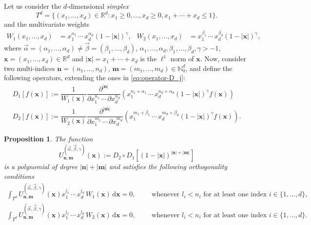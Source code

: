 \documentclass[11pt,reqno]{amsart}
\newcommand{\NN}{\mathbb{N}}
\newcommand{\RR}{\mathbb{R}}
\newcommand{\dr}{\mathrm{d}}
\newtheorem{proposition}[theorem]{Proposition}
\theoremstyle{definition}
\begin{document}
Let us consider the $d$-dimensional \textit{simplex}
\begin{equation}
\label{eq:simplex-multivariate}
    T^d = \{(x_1,\dots,x_d)\in\RR^d: x_1\geq 0,\dots,x_d\geq 0, x_1+\cdots + x_d\leq 1\}.
\end{equation}
and the multivariate weights
\begin{align*}
     W_1(x_1,\dots,x_d)&=x_1^{\alpha_1}\,\cdots\, x_d^{\alpha_d}(1-|\mathbf x|)^\gamma, & W_2(x_1,\dots,x_d)&=x_1^{\beta_1}\,\cdots\, x_d^{\beta_d}(1-|\mathbf x|)^\gamma,
\end{align*}
where $\vec \alpha = (\alpha_1,\dots,\alpha_d)\neq\vec \beta =(\beta_1,\dots,\beta_d)$, $\alpha_1,\dots,\alpha_d,\beta_1,\dots,\beta_d,\gamma>-1$, $\mathbf x =(x_1,\dots,x_d)\in \mathbb R^d$ and $|\mathbf x|=x_1+\cdots+x_d$ is the $\ell^1$ norm of $\mathbf x$. Now, consider two multi-indices $\mathbf n =(n_1,\dots,n_d)$, $\mathbf m =(m_1,\dots,m_d)\in\NN^d_0$, and define the following operators, extending the ones in \eqref{eq:operator-D_j}:
\begin{equation}
    \begin{array}{c}
     D_1[f(\mathbf x)]:= \dfrac{1}{W_1(\mathbf x)}\dfrac{\partial^{|\mathbf n|}}{\partial x_1^{n_1}\,\cdots \,\partial x_d^{n_d}}\left(x_1^{n_1+\alpha_1}\,\cdots\, x_d^{n_d+\alpha_d}(1-|\mathbf x|)^{\gamma}f(\mathbf x)\right)\\
     D_2[f(\mathbf x)]:= \dfrac{1}{W_2(\mathbf x)}\dfrac{\partial^{|\mathbf m|}}{\partial x_1^{m_1}\,\cdots \,\partial x_d^{m_d}}\left(x_1^{m_1+\beta_1}\,\cdots\, x_d^{m_d+\beta_d}(1-|\mathbf x|)^{\gamma}f(\mathbf x)\right).
    \end{array}
\end{equation}

\begin{proposition}
The function 
\begin{equation*}
    U^{(\vec \alpha,\vec \beta,\gamma)}_{\mathbf n,\mathbf m}(\mathbf x):= D_2\circ D_1[(1-|\mathbf x|)^{|\mathbf n|+|\mathbf m|}]
\end{equation*}
is a polynomial of degree $|\mathbf n|+|\mathbf m|$ and satisfies the following orthogonality conditions
\begin{equation}
\begin{array}{c}
     \displaystyle\int_{T^d} U^{(\vec \alpha,\vec \beta,\gamma)}_{\mathbf n,\mathbf m}(\mathbf x) x_1^{l_1}\,\cdots\, x_d^{l_d}\, W_1(\mathbf x)\, \dr \mathbf x = 0,\qquad \text{ whenever } l_i<n_i \text{ for at least one index } i\in\{1,\dots,d\},\\[7pt]
     \displaystyle\int_{T^d} U^{(\vec \alpha,\vec \beta,\gamma)}_{\mathbf n,\mathbf m}(\mathbf x) x_1^{l_1}\,\cdots\, x_d^{l_d} \,W_2(\mathbf x)\, \dr \mathbf x= 0,\qquad \text{ whenever } l_i<n_i \text{ for at least one index } i\in\{1,\dots,d\}.
\end{array}
\end{equation}
    
\end{proposition}
\end{document}
